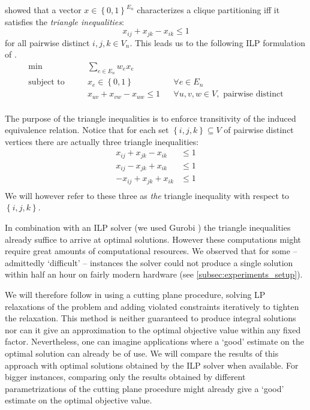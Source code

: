 \cite{grotschelFacetsCliquePartitioning1990} showed that a vector $x \in \left\{ 0,1 \right\}^{E_{n}}$ characterizes a clique partitioning iff it satisfies the \textit{triangle inequalities}:
\begin{equation}\label{eq:triangle_inequality}
	 x_{ij} + x_{jk} - x_{ik} \leq 1
\end{equation}
for all pairwise distinct $i,j,k \in V_{n}$.
This leads us to the following ILP formulation of \CP.
\begin{align*}
	\min && &\sum_{e \in E_{n}} w_{e} x_{e} \\[1.5ex]
	\text{subject to } && &x_{e} \in \left\{ 0,1 \right\} && \forall e \in E_{n} \\
					   && &x_{uv} + x_{vw} - x_{uw} \leq 1 && \forall u,v,w \in V, \text{ pairwise distinct} \\
\end{align*}

The purpose of the triangle inequalities is to enforce transitivity of the induced equivalence relation.
Notice that for each set $\left\{ i,j,k \right\} \subseteq V$ of pairwise distinct vertices there are actually three triangle inequalities:
\begin{align*}
	x_{ij} + x_{jk} - x_{ik} &\leq 1\\
	x_{ij} - x_{jk} + x_{ik} &\leq 1\\
	- x_{ij} + x_{jk} + x_{ik} &\leq 1\\
\end{align*}
We will however refer to these three as \textit{the} triangle inequality with respect to $\left\{ i,j,k \right\}$.

In combination with an ILP solver (we used Gurobi \cite{gurobioptimizationllcGurobiOptimizerReference2023}) the triangle inequalities already suffice to arrive at optimal solutions.
However these computations might require great amounts of computational resources.
We observed that for some – admittedly ‘difficult’ – instances the solver could not produce a single solution within half an hour on fairly modern hardware (see \cref{subsec:experiments_setup}).

We will therefore follow \cite{grotschelFacetsCliquePartitioning1990} in using a cutting plane procedure, \ie solving LP relaxations of the problem and adding violated constraints iteratively to tighten the relaxation.
This method is neither guaranteed to produce integral solutions nor can it give an approximation to the optimal objective value within any fixed factor.
Nevertheless, one can imagine applications where a ‘good’ estimate on the optimal solution can already be of use.
We will compare the results of this approach with optimal solutions obtained by the ILP solver when available.
For bigger instances, comparing only the results obtained by different parametrizations of the cutting plane procedure might already give a ‘good’ estimate on the optimal objective value.

